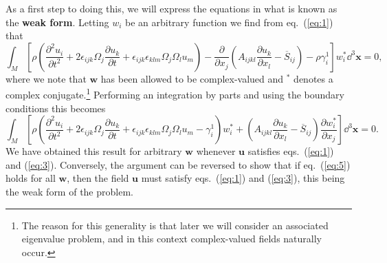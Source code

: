 As a first step to doing this, we will express the equations in what is known as the \textbf{weak form}. 
Letting $w_{i}$ be an arbitrary function we find from eq.~(\ref{eq:1}) that
\begin{equation}
\int_{M}\left[\rho\left(\frac{\partial^{2}u_{i}}{\partial t^{2}}+2\epsilon_{ijk}\Omega_{j}\frac{\partial u_{k}}{\partial t}+\epsilon_{ijk}\epsilon_{klm}\Omega_{j}\Omega_{l}u_{m}\right)-\frac{\partial}{\partial x_{j}}\left(A_{ijkl}\frac{\partial u_{k}}{\partial x_{l}}-\overline{S}_{ij}\right)-\rho\gamma_{i}^{1}\right]w_{i}^{*}\dd^{3}\mathbf{x}=0,
\label{eq:4}
\end{equation}
where we note that $\mathbf{w}$ has been allowed to be complex-valued and $^*$ denotes a complex conjugate.\footnote{The reason for this generality is that later we
 will consider an associated eigenvalue problem, and in this context complex-valued fields naturally occur.} Performing an integration by parts and using the 
 boundary conditions this becomes
\begin{equation}
\int_{M}\left[\rho\left(\frac{\partial^{2}u_{i}}{\partial t^{2}}+2\epsilon_{ijk}\Omega_{j}\frac{\partial u_{k}}{\partial t}+\epsilon_{ijk}\epsilon_{klm}\Omega_{j}\Omega_{l}u_{m}-\gamma_{i}^{1}\right)w_{i}^{*}+\left(A_{ijkl}\frac{\partial u_{k}}{\partial x_{l}}-\overline{S}_{ij}\right)\frac{\partial w_{i}^{*}}{\partial x_{j}}\right]\dd^{3}\mathbf{x}=0.
\label{eq:5}
\end{equation}
We have obtained this result for arbitrary $\mathbf{w}$ whenever $\mathbf{u}$ satisfies eqs.~(\ref{eq:1}) and (\ref{eq:3}). Conversely, the argument can be 
reversed to show that if eq.~(\ref{eq:5}) holds for all $\mathbf{w}$, then the field $\mathbf{u}$ must satisfy eqs.~(\ref{eq:1}) and (\ref{eq:3}), 
this being the weak form of the problem.


